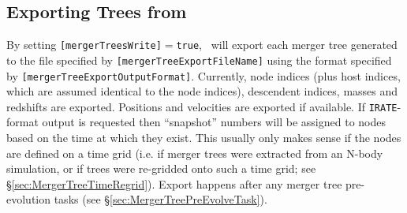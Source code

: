 \subsection{Exporting Trees from \glc}

By setting {\tt [mergerTreesWrite]}$=${\tt true}, \glc\ will export each merger tree generated to the file specified by {\tt [mergerTreeExportFileName]} using the format specified by {\tt [mergerTreeExportOutputFormat]}. Currently, node indices (plus host indices, which are assumed identical to the node indices), descendent indices, masses and redshifts are exported. Positions and velocities are exported if available. If {\tt IRATE}-format output is requested then ``snapshot'' numbers will be assigned to nodes based on the time at which they exist. This usually only makes sense if the nodes are defined on a time grid (i.e. if merger trees were extracted from an N-body simulation, or if trees were re-gridded onto such a time grid; see \S\ref{sec:MergerTreeTimeRegrid}). Export happens after any merger tree pre-evolution tasks (see \S\ref{sec:MergerTreePreEvolveTask}).
